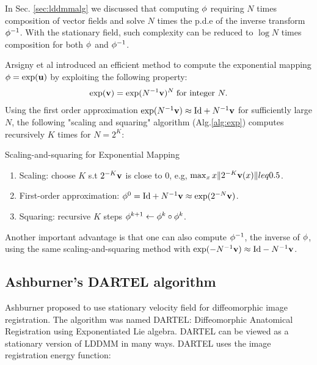 \documentclass[letterpaper,12pt]{article}
\begin{document}
In Sec. \ref{sec:lddmmalg} we discussed that computing $\phi$ requiring $N$ times composition of vector fields and solve $N$ times the p.d.e of the inverse transform $\phi^{-1}$. With the stationary field, such complexity can be reduced to $\log N$ times composition for both $\phi$ and $\phi^{-1}$. 

Arsigny et al \cite{Arsigny2006} introduced an efficient method to compute the exponential mapping $\phi = \exp(\mathbf{u})$ by exploiting the following property:
\begin{align}
\exp(\mathbf{v}) = \exp(N^{-1} \mathbf{v} )^N \;\text{for integer } N.
\end{align}
Using the first order approximation $\exp(N^{-1} \mathbf{v}) \approx \text{Id} + N^{-1}\mathbf{v}$ for sufficiently large $N$, the following "scaling and squaring" algorithm (Alg.\ref{alg:exp}) computes recursively $K$ times for $N = 2^K$:
\begin{algorithm}
\caption{Scaling-and-squaring for Exponential Mapping}
\label{alg:exp}
\begin{enumerate}
\item{Scaling: choose $K$ s.t $2^{-K}\mathbf{v}$ is close to 0, e.g, $\max_x x\|2^{-K}\mathbf{v}(x)\| leq 0.5 $. 
}
\item{First-order approximation: $\phi^{0} =  \text{Id} + N^{-1}\mathbf{v} \approx \exp(2^{-N} \mathbf{v}) $.
}
\item{Squaring: recursive $K$ steps $\phi^{k+1} \leftarrow \phi^{k} \circ \phi^{k}$. 
}
\end{enumerate}
\end{algorithm}

Another important advantage is that one can also compute $\phi^{-1}$, the inverse of $\phi$, using the same scaling-and-squaring method with $\exp(-N^{-1} \mathbf{v}) \approx \text{Id} - N^{-1}\mathbf{v}$. 


\subsection{Ashburner's DARTEL algorithm}

Ashburner proposed to use stationary velocity field for diffeomorphic image registration. The algorithm was named DARTEL: Diffeomorphic Anatomical Registration using Exponentiated Lie algebra. DARTEL can be viewed as a stationary version of LDDMM in many ways. DARTEL uses the image registration energy
 function:
\end{document}
